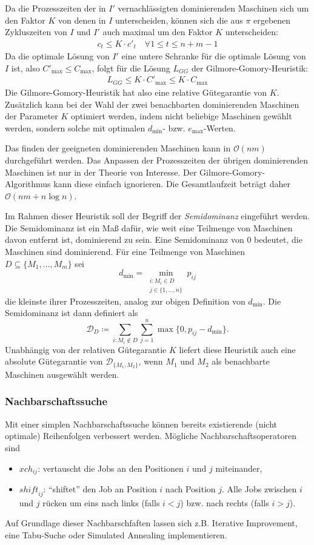 \documentclass{scrreprt}
\begin{document}
Da die Prozesszeiten der in $I'$ vernachlässigten dominierenden Maschinen sich um den Faktor $K$ von denen in $I$ unterscheiden, 
können sich die aus $\pi$ ergebenen Zykluszeiten von $I$ und $I'$ auch maximal um den Faktor $K$ unterscheiden:
\begin{align}
    c_t \leq K\cdot c'_t \quad \forall 1\leq t\leq n+m-1
\end{align}
Da die optimale Lösung von $I'$ eine untere Schranke für die optimale Lösung von $I$ ist, also $C'_{\max} \leq C_{\max}$, folgt für die Lösung $L_{GG}$ der
Gilmore-Gomory-Heuristik:
\begin{align}
    L_{GG} \leq K\cdot C'_{\max} \leq K\cdot C_{\max}
\end{align}
Die Gilmore-Gomory-Heuristik hat also eine relative Gütegarantie von $K$.
Zusätzlich kann bei der Wahl der zwei benachbarten dominierenden Maschinen der Parameter $K$ optimiert werden, indem nicht beliebige Maschinen gewählt werden,
sondern solche mit optimalen $d_{\min}$- bzw. $e_{\max}$-Werten.

Das finden der geeigneten dominierenden Maschinen kann in $\mathcal{O}(nm)$ durchgeführt werden. 
Das Anpassen der Prozesszeiten der übrigen dominierenden Maschinen ist nur in der Theorie von Interesse.
Der Gilmore-Gomory-Algorithmus kann diese einfach ignorieren.
Die Gesamtlaufzeit beträgt daher $\mathcal{O}(nm + n\log n)$.

Im Rahmen dieser Heuristik soll der Begriff der \textit{Semidominanz} eingeführt werden.
Die Semidominanz ist ein Maß dafür, wie weit eine Teilmenge von Maschinen davon entfernt ist, dominierend zu sein.
Eine Semidominanz von $0$ bedeutet, die Maschinen sind dominierend.
Für eine Teilmenge von Maschinen $D\subseteq\{M_1,\ldots,M_m\}$ sei 
\[d_{\min} = \min_{\substack{i:M_i\in D \\ j\in\{1,\ldots,n\}}} p_{ij}\] 
die kleinste ihrer Prozesszeiten, analog zur obigen Definition von $d_{\min}$.
Die Semidominanz ist dann definiert als
\[\mathcal{D}_{D} \coloneqq \sum_{i: M_i\not\in D} \sum_{j=1}^n \max\{0,p_{ij}-d_{\min}\} \text{.}\]
Unabhängig von der relativen Gütegarantie $K$ liefert diese Heuristik auch eine absolute Gütegarantie von $\mathcal{D}_{\{M_1,M_2\}}$, 
wenn $M_1$ und $M_2$ als benachbarte Maschinen ausgewählt werden.

\subsubsection{Nachbarschaftssuche}
Mit einer simplen Nachbarschaftssuche können bereits existierende (nicht optimale) Reihenfolgen verbessert werden.
Mögliche Nachbarschaftsoperatoren sind
\begin{itemize}
    \item $\mathit{xch}_{ij}$: vertauscht die Jobs an den Positionen $i$ und $j$ miteinander,
    \item $\mathit{shift}_{ij}$: "`shiftet"' den Job an Position $i$ nach Position $j$. 
        Alle Jobs zwischen $i$ und $j$ rücken um eins nach links (falls $i<j$) bzw. nach rechts (falls $i>j$).
\end{itemize}
Auf Grundlage dieser Nachbarschfaften lassen sich z.B. Iterative Improvement, eine Tabu-Suche oder Simulated Annealing implementieren.
\end{document}
